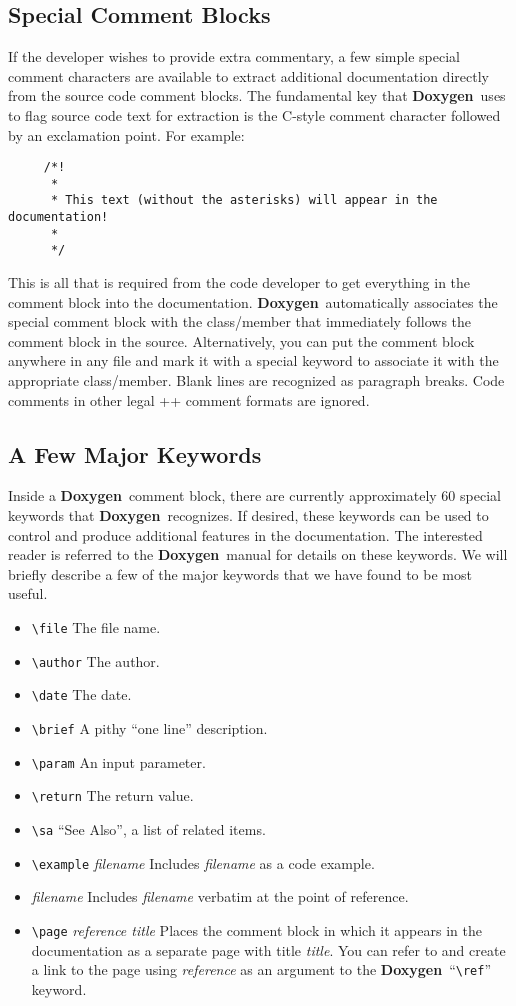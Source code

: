 \documentclass[11pt]{nmemo}
\newcommand{\doxy}{{\normalfont\bfseries Doxygen}}
\begin{document}
\subsection{Special Comment Blocks}
\label{sec:spcom}

If the developer wishes to provide extra commentary, 
a few simple special comment characters are available to extract additional 
documentation directly from the source code comment blocks.
The fundamental key that \doxy\ uses to flag source code text for
extraction is the C-style comment character followed by an exclamation
point. For example:
\begin{verbatim}
     /*!
      *
      * This text (without the asterisks) will appear in the documentation!
      *
      */
\end{verbatim}
This is all that is required from the code developer to get everything
in the comment block into the documentation. \doxy\ automatically associates
the special comment block with the class/member that immediately follows the 
comment block in the source. Alternatively, you can put the comment block
anywhere in any file and mark it with a special keyword to associate it
with the appropriate class/member. Blank lines are recognized as paragraph
breaks. Code comments in other legal \C++ comment formats are ignored.

\subsection{A Few Major Keywords}

Inside a \doxy\ comment block, there are currently approximately 60
special keywords that \doxy\ recognizes. If desired, these keywords
can be used to control and produce additional features in the
documentation.  The interested reader is referred to the \doxy\ manual
for details on these keywords.  We will briefly describe a few of the major
keywords that we have found to be most useful.
\begin{itemize}
\item \verb+\file+ The file name.
\item \verb+\author+ The author.
\item \verb+\date+ The date.
\item \verb+\brief+ A pithy ``one line'' description.
\item \verb+\param+ An input parameter.
\item \verb+\return+ The return value.
\item \verb+\sa+ ``See Also'', a list of related items.
\item \verb+\example+ {\em filename} Includes {\em filename} as a code
  example.
\item \verb++ {\em filename} Includes {\em filename} verbatim at the
  point of reference.
\item \verb+\page+ {\em reference title} Places the comment block in which
  it appears in the documentation as a separate page with title {\em
    title}. You can refer to and create a link to the page using {\em
    reference} as an argument to the \doxy\ ``\verb+\ref+'' keyword.
\end{itemize}
\end{document}
